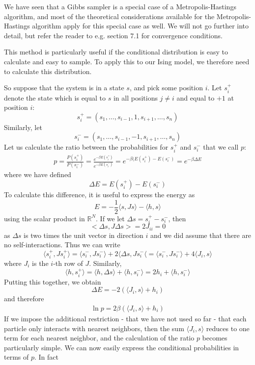 \documentclass[a4paper, draft]{article}
\theoremstyle{own}
\theoremstyle{remark}
\newcommand{\R}{\mathbb{R}}
\begin{document}
We have seen that a Gibbs sampler is a special case of a Metropolis-Hastings algorithm, and most of the theoretical considerations available for the Metropolis-Hastings algorithm apply for this special case as well. We will not go further into detail, but refer the reader to e.g. \cite{RobertCasella1999} section 7.1 for convergence conditions. 

This method is particularly useful if the conditional distribution is easy to calculate and easy to sample. To apply this to our Ising model, we therefore need to calculate this distribution.

So suppose that the system is in a state $s$, and pick some position $i$. Let $s_i^+$ denote the state which is equal to $s$ in all positions $j \neq i$ and equal to $+1$ at position $i$:
$$
s_i^+ = (s_1, \dots, s_{i-1}, 1, s_{i+1}, \dots, s_n)
$$
Similarly, let
$$
s_i^- = (s_1, \dots, s_{i-1}, -1, s_{i+1}, \dots, s_n)
$$
Let us calculate the ratio between the probabilities for $s_i^+$ and $s_i^-$ that we call $p$:
\begin{align*}
p = \frac{P(s_i^+)}{P(s_i^-)} = \frac{e^{-\beta E(s_i^+)}}{e^{-\beta E(s_i^-)}}
= e^{-\beta(E(s_i^+) - E(s_i^-)} = e^{-\beta \Delta E}
\end{align*}
where we have defined
$$
\Delta E = E(s_i^+) - E(s_i^-)
$$
To calculate this difference, it is useful to express the energy as
$$
E = - \frac{1}{2} \langle s, Js \rangle - \langle h,s \rangle
$$
using the scalar product in $\R^N$. If we let $\Delta s = s_i^+ - s_i^-$, then 
$$
<\Delta s , J \Delta s> = 2 J_{ii} = 0
$$
as $\Delta s$ is two times the unit vector in direction $i$ and we did assume that there are no self-interactions. Thus we can write
$$
\langle s_i^+, J s_i^+ \rangle = \langle s_i^-, J s_i^- \rangle 
+ 2 \langle \Delta s, J s_i^- \langle = \langle s_i^-, J s_i^- \rangle 
+ 4 \langle J_i, s \rangle
$$
where $J_i$ is the $i$-th row of $J$. Similarly,
$$
\langle h, s_i^+ \rangle = \langle h, \Delta s  \rangle + \langle h, s_i^- \rangle
= 2 h_i + \langle h, s_i^- \rangle
$$
Putting this together, we obtain
$$
\Delta E = - 2 ( \langle J_i, s \rangle + h_i)
$$
and therefore
\begin{align}\label{eq:gibbsprobabilityratio}
\ln p =  2\beta ( \langle J_i, s \rangle + h_i)
\end{align}
If we impose the additional restriction - that we have not used so far - that each particle only interacts with nearest neighbors, then the sum $\langle J_i, s \rangle$ reduces to one term for each nearest neighbor, and the calculation of the ratio $p$ becomes particularly simple. We can now easily express the conditional probabilities in terms of $p$. In fact
\end{document}
